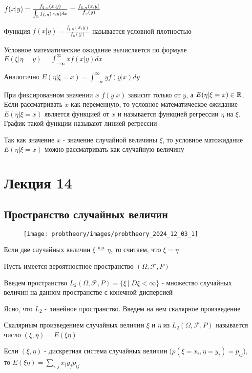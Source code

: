\documentclass[12pt]{article}
\begin{document}
    $f(x | y) = \frac{f_{\xi, \eta}(x, y)}{\int_{\mathbb{R}} f_{\xi, \eta}(x, y)dx} = \frac{f_{\xi, \eta}(x, y)}{f_{\eta}(y)}$

    \Def Функция $f(x | y) = \frac{f_{\xi, \eta}(x, y)}{f_{\eta}(y)}$ называется условной плотностью

    \Def Условное математические ожидание вычисляется по формуле $E(\xi | \eta = y) = \int_{-\infty}^\infty xf(x | y)dx$

    Аналогично $E(\eta | \xi = x) = \int_{-\infty}^\infty yf(y | x)dy$

    \Nota При фиксированном значении $x$ $f(y | x)$ зависит только от $y$, а $E(\eta | \xi = x) \in \mathbb{R}$. 
    Если рассматривать $x$ как переменную, то условное математическое ожидание $E(\eta | \xi = x)$ является
    функцией от $x$ и называется функцией регрессии $\eta$ на $\xi$. График такой функции называют линией регрессии

    \Nota Так как значение $x$ - значение случайной величины $\xi$, то условное матожидание $E(\eta | \xi = x)$ 
    можно рассматривать как случайную величину






\section{Лекция 14}

\subsection{Пространство случайных величин}

\begin{minipage}{\textwidth}
    \begin{wrapfigure}{r}{0pt}
        \texttt{[image: probtheory/images/probtheory\_2024\_12\_03\_1]}
    \end{wrapfigure}

    \Nota Если две случайных величин $\xi \overset{\text{п.н.}}{=} \eta$, то считаем, что $\xi = \eta$

    Пусть имеется вероятностное пространство $(\Omega, \mathcal{F}, P)$

    Введем пространство $L_2 (\Omega, \mathcal{F}, P) = \{\xi \ | \ D\xi < \infty\}$ - множество случайных величин 
    на данном пространстве с конечной дисперсией

    Ясно, что $L_2$ - линейное пространство. Введем на нем скалярное произведение

    \Def Скалярным произведением случайных величин $\xi$ и $\eta$ из $L_2(\Omega, \mathcal{F}, P)$ 
    называется число $(\xi, \eta) = E(\xi\eta)$

    \Nota Если $(\xi, \eta)$ - дискретная система случайных величин ($p(\xi = x_i, \eta = y_i) = p_{ij}$), 
    то $E(\xi\eta) = \sum_{i, j} x_i y_j p_{ij}$
\end{minipage}
\end{document}

